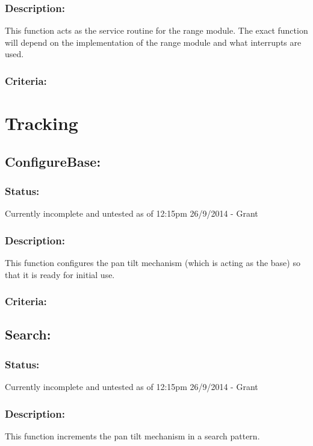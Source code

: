 \documentclass[]{report}
\begin{document}
\subsubsection{Description:}
This function acts as the service routine for the range module. The exact function will depend on the implementation of the range module and what interrupts are used.

\subsubsection{Criteria:}

\newpage
\section{Tracking}

\subsection{ConfigureBase:}
\subsubsection{Status:}
Currently incomplete and untested as of 12:15pm 26/9/2014 - Grant

\subsubsection{Description:}
This function configures the pan tilt mechanism (which is acting as the base) so that it is ready for initial use.

\subsubsection{Criteria:}

\subsection{Search:}
\subsubsection{Status:}
Currently incomplete and untested as of 12:15pm 26/9/2014 - Grant

\subsubsection{Description:}
This function increments the pan tilt mechanism in a search pattern.
\end{document}
